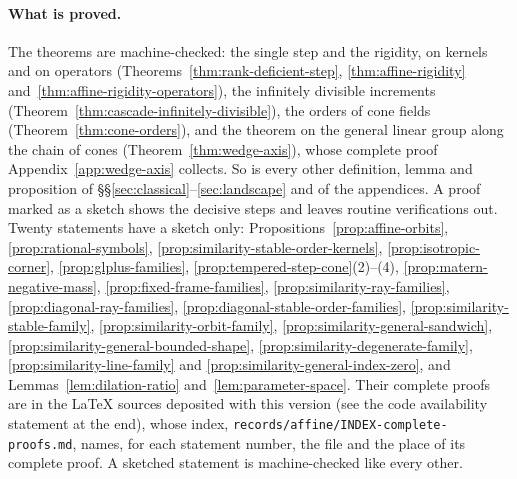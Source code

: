 \paragraph{What is proved.} The theorems are machine-checked: the single step and the rigidity, on
kernels and on operators (Theorems~\ref{thm:rank-deficient-step}, \ref{thm:affine-rigidity}
and~\ref{thm:affine-rigidity-operators}), the infinitely divisible increments
(Theorem~\ref{thm:cascade-infinitely-divisible}), the orders of cone fields
(Theorem~\ref{thm:cone-orders}), and the theorem on the general linear group along the chain of
cones (Theorem~\ref{thm:wedge-axis}), whose complete proof Appendix~\ref{app:wedge-axis} collects. So is
every other definition, lemma and proposition of \S\S\ref{sec:classical}--\ref{sec:landscape} and of
the appendices. A proof
marked as a sketch shows the decisive steps and leaves routine verifications out. Twenty statements
have a sketch only: Propositions~\ref{prop:affine-orbits},
\ref{prop:rational-symbols}, \ref{prop:similarity-stable-order-kernels},
\ref{prop:isotropic-corner}, \ref{prop:glplus-families}, \ref{prop:tempered-step-cone}(2)--(4),
\ref{prop:matern-negative-mass}, \ref{prop:fixed-frame-families}, \ref{prop:similarity-ray-families},
\ref{prop:diagonal-ray-families}, \ref{prop:diagonal-stable-order-families},
\ref{prop:similarity-stable-family}, \ref{prop:similarity-orbit-family},
\ref{prop:similarity-general-sandwich}, \ref{prop:similarity-general-bounded-shape},
\ref{prop:similarity-degenerate-family}, \ref{prop:similarity-line-family} and
\ref{prop:similarity-general-index-zero}, and Lemmas~\ref{lem:dilation-ratio}
and~\ref{lem:parameter-space}. Their complete proofs are in the LaTeX sources deposited with this
version (see the code availability statement at the end), whose index,
\texttt{records/affine/INDEX-complete-proofs.md}, names, for each statement
number, the file and the place of its complete proof. A sketched statement is machine-checked like
every other.

